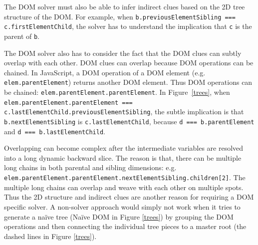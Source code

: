 The DOM solver must also be able to infer indirect clues based on the 2D tree structure of the DOM.  For example, when {\tt b.previousElementSibling === c.firstElementChild}, the solver has to understand the implication that {\tt c} is the parent of {\tt b}.  

The DOM solver also has to consider the fact that the DOM clues can subtly overlap with each other.  DOM clues can overlap because DOM operations can be chained.  In JavaScript, a DOM operation of a DOM element (e.g. {\tt elem.parentElement}) returns another DOM element.  Thus DOM operations can be chained: {\tt elem.parentElement.parentElement}.  
In Figure~\ref{trees}, when {\tt elem.parentElement.parentElement === c.lastElementChild.previousElementSibling}, the subtle implication is that {\tt b.nextElementSibling} is {\tt c.lastElementChild}, because {\tt d === b.parentElement} and {\tt d === b.lastElementChild}.  

Overlapping can become complex after the intermediate variables are resolved into a long dynamic backward slice.  The reason is that, there can be multiple long chains in both parental and sibling dimensions: e.g. {\tt elem.parentElement.parentElement.nextElementSibling.children[2]}.  
The multiple long chains can overlap and weave with each other on multiple spots.
Thus the 2D structure and indirect clues are another reason for requiring a DOM specific solver.  A non-solver approach would simply not work when it tries to generate a naïve tree (Naïve DOM in Figure \ref{trees}) by grouping the DOM operations and then connecting the individual tree pieces to a master root (the dashed lines in Figure \ref{trees}).  


